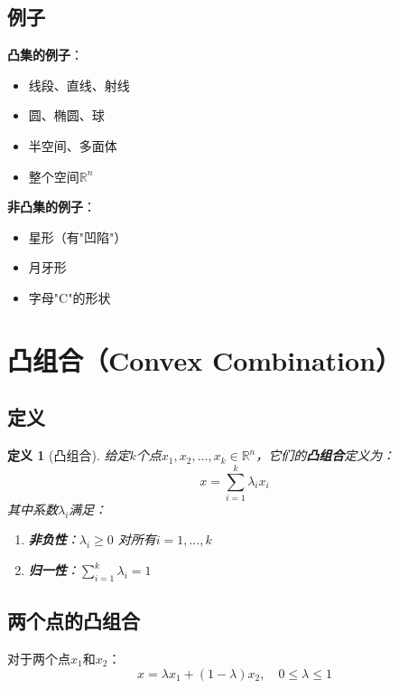 \documentclass[12pt,a4paper]{article}
\newtheorem{definition}{定义}
\begin{document}
\subsection{例子}

\textbf{凸集的例子}：
\begin{itemize}
\item 线段、直线、射线
\item 圆、椭圆、球
\item 半空间、多面体
\item 整个空间$\mathbb{R}^n$
\end{itemize}

\textbf{非凸集的例子}：
\begin{itemize}
\item 星形（有"凹陷"）
\item 月牙形
\item 字母"C"的形状
\end{itemize}

\section{凸组合（Convex Combination）}

\subsection{定义}

\begin{definition}[凸组合]
给定$k$个点$x_1, x_2, \ldots, x_k \in \mathbb{R}^n$，它们的\textbf{凸组合}定义为：
\begin{equation}
x = \sum_{i=1}^k \lambda_i x_i
\end{equation}
其中系数$\lambda_i$满足：
\begin{enumerate}
\item \textbf{非负性}：$\lambda_i \geq 0$ 对所有$i = 1, \ldots, k$
\item \textbf{归一性}：$\sum_{i=1}^k \lambda_i = 1$
\end{enumerate}
\end{definition}

\subsection{两个点的凸组合}

对于两个点$x_1$和$x_2$：
\begin{equation}
x = \lambda x_1 + (1-\lambda) x_2, \quad 0 \leq \lambda \leq 1
\end{equation}
\end{document}
